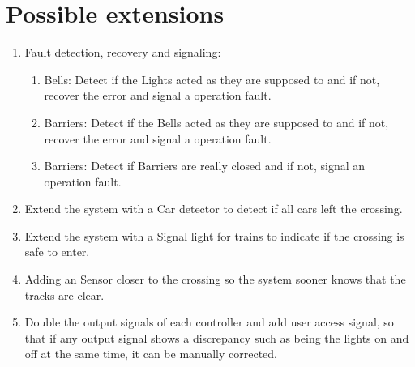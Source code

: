 \documentclass[final]{report}
\begin{document}
\section{Possible extensions}
	\begin{enumerate}
	\item Fault detection, recovery and signaling:
		\begin{enumerate}
			\item Bells: Detect if the Lights acted as they are supposed to and if not, recover the error and signal a operation fault.
			\item Barriers: Detect if the Bells acted as they are supposed to and if not, recover the error and signal a operation fault.
			\item Barriers: Detect if Barriers are really closed and if not, signal an operation fault.
		\end{enumerate}

	\item Extend the system with a Car detector to detect if all cars left the crossing.
	\item Extend the system with a Signal light for trains to indicate if the crossing is safe to enter.
	\item Adding an Sensor closer to the crossing so the system sooner knows that the tracks are clear.
	\item Double the output signals of each controller and add user access signal, so that if any output signal shows a discrepancy such as being the lights on and off at the same time, it can be manually corrected. 
	\end{enumerate}
\end{document}
